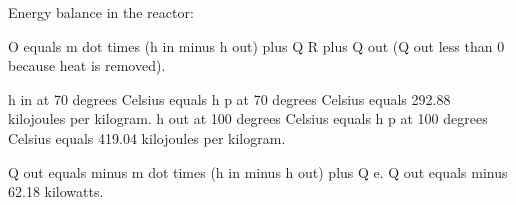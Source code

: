 Energy balance in the reactor:  

O equals m dot times (h in minus h out) plus Q R plus Q out (Q out less than 0 because heat is removed).  

h in at 70 degrees Celsius equals h p at 70 degrees Celsius equals 292.88 kilojoules per kilogram.  
h out at 100 degrees Celsius equals h p at 100 degrees Celsius equals 419.04 kilojoules per kilogram.  

Q out equals minus m dot times (h in minus h out) plus Q e.  
Q out equals minus 62.18 kilowatts.